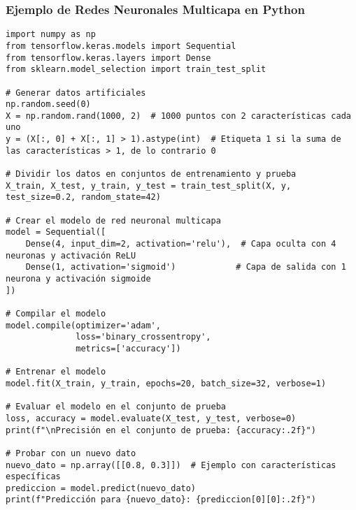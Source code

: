 \documentclass[11pt]{article}
\begin{document}
\subsubsection*{Ejemplo de Redes Neuronales Multicapa en Python}
\label{sec:org2803648}
\begin{verbatim}
import numpy as np
from tensorflow.keras.models import Sequential
from tensorflow.keras.layers import Dense
from sklearn.model_selection import train_test_split

# Generar datos artificiales
np.random.seed(0)
X = np.random.rand(1000, 2)  # 1000 puntos con 2 características cada uno
y = (X[:, 0] + X[:, 1] > 1).astype(int)  # Etiqueta 1 si la suma de las características > 1, de lo contrario 0

# Dividir los datos en conjuntos de entrenamiento y prueba
X_train, X_test, y_train, y_test = train_test_split(X, y, test_size=0.2, random_state=42)

# Crear el modelo de red neuronal multicapa
model = Sequential([
    Dense(4, input_dim=2, activation='relu'),  # Capa oculta con 4 neuronas y activación ReLU
    Dense(1, activation='sigmoid')            # Capa de salida con 1 neurona y activación sigmoide
])

# Compilar el modelo
model.compile(optimizer='adam',
              loss='binary_crossentropy',
              metrics=['accuracy'])

# Entrenar el modelo
model.fit(X_train, y_train, epochs=20, batch_size=32, verbose=1)

# Evaluar el modelo en el conjunto de prueba
loss, accuracy = model.evaluate(X_test, y_test, verbose=0)
print(f"\nPrecisión en el conjunto de prueba: {accuracy:.2f}")

# Probar con un nuevo dato
nuevo_dato = np.array([[0.8, 0.3]])  # Ejemplo con características específicas
prediccion = model.predict(nuevo_dato)
print(f"Predicción para {nuevo_dato}: {prediccion[0][0]:.2f}")
\end{verbatim}
\end{document}
